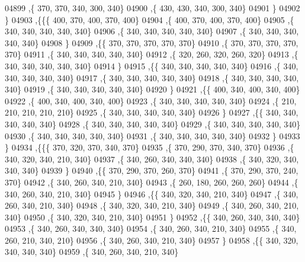 \begin{DoxyCode}
04899     ,\{   370,   370,   340,   300,   340\}
04900     ,\{   430,   430,   340,   300,   340\}
04901     \}
04902    \}
04903   ,\{\{\{   400,   370,   400,   370,   400\}
04904     ,\{   400,   370,   400,   370,   400\}
04905     ,\{   340,   340,   340,   340,   340\}
04906     ,\{   340,   340,   340,   340,   340\}
04907     ,\{   340,   340,   340,   340,   340\}
04908     \}
04909    ,\{\{   370,   370,   370,   370,   370\}
04910     ,\{   370,   370,   370,   370,   370\}
04911     ,\{   340,   340,   340,   340,   340\}
04912     ,\{   320,   260,   320,   260,   320\}
04913     ,\{   340,   340,   340,   340,   340\}
04914     \}
04915    ,\{\{   340,   340,   340,   340,   340\}
04916     ,\{   340,   340,   340,   340,   340\}
04917     ,\{   340,   340,   340,   340,   340\}
04918     ,\{   340,   340,   340,   340,   340\}
04919     ,\{   340,   340,   340,   340,   340\}
04920     \}
04921    ,\{\{   400,   340,   400,   340,   400\}
04922     ,\{   400,   340,   400,   340,   400\}
04923     ,\{   340,   340,   340,   340,   340\}
04924     ,\{   210,   210,   210,   210,   210\}
04925     ,\{   340,   340,   340,   340,   340\}
04926     \}
04927    ,\{\{   340,   340,   340,   340,   340\}
04928     ,\{   340,   340,   340,   340,   340\}
04929     ,\{   340,   340,   340,   340,   340\}
04930     ,\{   340,   340,   340,   340,   340\}
04931     ,\{   340,   340,   340,   340,   340\}
04932     \}
04933    \}
04934   ,\{\{\{   370,   320,   370,   340,   370\}
04935     ,\{   370,   290,   370,   340,   370\}
04936     ,\{   340,   320,   340,   210,   340\}
04937     ,\{   340,   260,   340,   340,   340\}
04938     ,\{   340,   320,   340,   340,   340\}
04939     \}
04940    ,\{\{   370,   290,   370,   260,   370\}
04941     ,\{   370,   290,   370,   240,   370\}
04942     ,\{   340,   260,   340,   210,   340\}
04943     ,\{   260,   180,   260,   260,   260\}
04944     ,\{   340,   260,   340,   210,   340\}
04945     \}
04946    ,\{\{   340,   320,   340,   210,   340\}
04947     ,\{   340,   260,   340,   210,   340\}
04948     ,\{   340,   320,   340,   210,   340\}
04949     ,\{   340,   260,   340,   210,   340\}
04950     ,\{   340,   320,   340,   210,   340\}
04951     \}
04952    ,\{\{   340,   260,   340,   340,   340\}
04953     ,\{   340,   260,   340,   340,   340\}
04954     ,\{   340,   260,   340,   210,   340\}
04955     ,\{   340,   260,   210,   340,   210\}
04956     ,\{   340,   260,   340,   210,   340\}
04957     \}
04958    ,\{\{   340,   320,   340,   340,   340\}
04959     ,\{   340,   260,   340,   210,   340\}

\end{DoxyCode}
